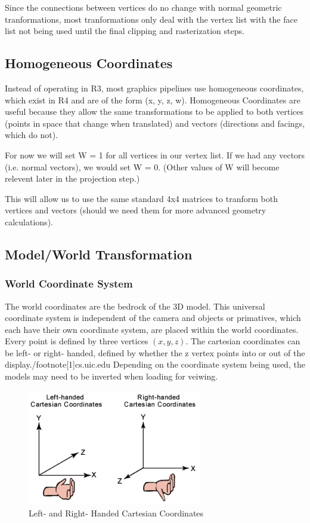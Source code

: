 \documentclass{article}
\begin{document}
Since the connections between vertices do no change with normal geometric tranformations, most tranformations only deal with the vertex list with the face list not being used until the final clipping and rasterization steps.

\subsection{Homogeneous Coordinates}
Instead of operating in R3, most graphics pipelines use homogeneous coordinates, which exist in R4 and are of the form (x, y, z, w). Homogeneous Coordinates are useful because they allow the same transformations to be applied to both vertices (points in space that change when translated) and vectors (directions and facings, which do not).

For now we will set W = 1 for all vertices in our vertex list. If we had any vectors (i.e. normal vectors), we would set W = 0. (Other values of W will become relevent later in the projection step.)

This will allow us to use the same standard 4x4 matrices to tranform both vertices and vectors (should we need them for more advanced geometry calculations).

\subsection{Model/World Transformation}
\subsubsection{World Coordinate System}
The world coordinates are the bedrock of the 3D model. This universal coordinate system is independent of the camera and objects or primatives, which each have their own coordinate system, are placed within the world coordinates. Every point is defined by three vertices $(x, y, z)$. The cartesian coordinates can be left- or right- handed, defined by whether the z vertex points into or out of the display./footnote[1]{cs.uic.edu} Depending on the coordinate system being used, the models may need to be inverted when loading for veiwing.

\begin{figure}
    \centering
    \includegraphics[width=3.0in]{leftrght.png}
    \caption{Left- and Right- Handed Cartesian Coordinates}
    \label{LeftRight}
\end{figure}
\end{document}

